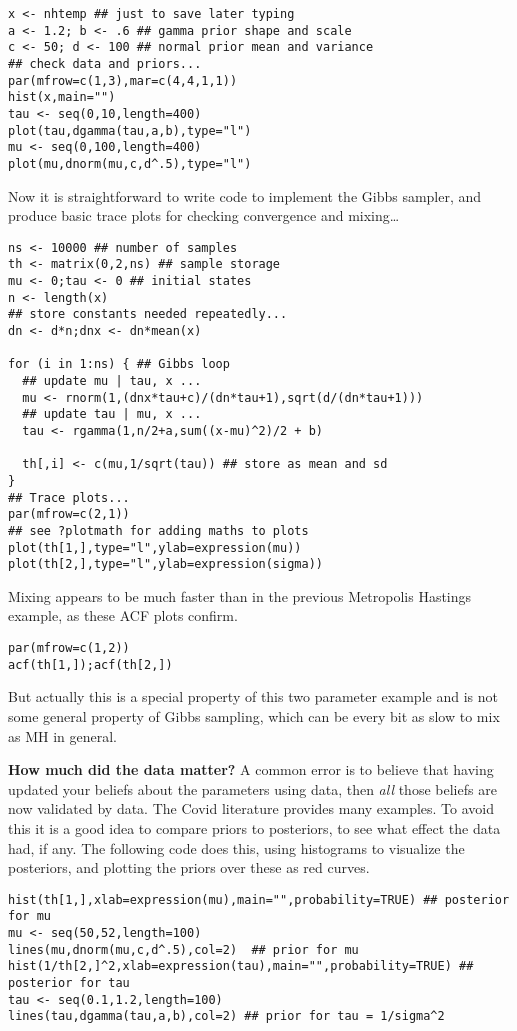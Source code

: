 \documentclass[10pt] {article}
\newcommand{\eps}[3]
{{\begin{center}
 \rotatebox{#1}{\scalebox{#2}{\texttt{[image: \#3]}}}
 \end{center}}
}
\theoremstyle{definition}
\begin{document}
\begin{lstlisting}
x <- nhtemp ## just to save later typing
a <- 1.2; b <- .6 ## gamma prior shape and scale
c <- 50; d <- 100 ## normal prior mean and variance
## check data and priors...
par(mfrow=c(1,3),mar=c(4,4,1,1))
hist(x,main="")
tau <- seq(0,10,length=400)
plot(tau,dgamma(tau,a,b),type="l")
mu <- seq(0,100,length=400)
plot(mu,dnorm(mu,c,d^.5),type="l")
\end{lstlisting}
\eps{-90}{.6}{check-prior.eps}
Now it is straightforward to write code to implement the Gibbs sampler, and produce basic trace plots for checking convergence and mixing\ldots 
\begin{lstlisting}
ns <- 10000 ## number of samples
th <- matrix(0,2,ns) ## sample storage
mu <- 0;tau <- 0 ## initial states
n <- length(x) 
## store constants needed repeatedly...
dn <- d*n;dnx <- dn*mean(x) 

for (i in 1:ns) { ## Gibbs loop
  ## update mu | tau, x ... 
  mu <- rnorm(1,(dnx*tau+c)/(dn*tau+1),sqrt(d/(dn*tau+1)))
  ## update tau | mu, x ... 
  tau <- rgamma(1,n/2+a,sum((x-mu)^2)/2 + b)
  
  th[,i] <- c(mu,1/sqrt(tau)) ## store as mean and sd
}
## Trace plots...
par(mfrow=c(2,1))
## see ?plotmath for adding maths to plots
plot(th[1,],type="l",ylab=expression(mu))
plot(th[2,],type="l",ylab=expression(sigma))
\end{lstlisting}
\eps{-90}{.5}{nh-trace.eps}
\noindent Mixing appears to be  much faster than in the previous Metropolis Hastings example, as these ACF plots confirm.
\begin{lstlisting}
par(mfrow=c(1,2))
acf(th[1,]);acf(th[2,])
\end{lstlisting}

\vspace*{-1cm}

\eps{-90}{.4}{nh-acf.eps}
\noindent But actually this is a special property of this two parameter example and is not some general property of Gibbs sampling, which can be every bit as slow to mix as MH in general. 

{\bf How much did the data matter?} A common error is to believe that having updated your beliefs about the parameters using data, then {\em all} those beliefs are now validated by data. The Covid literature provides many examples. To avoid this it is a good idea to compare priors to posteriors, to see what effect the data had, if any. The following code does this, using histograms to visualize the posteriors, and plotting the priors over these as red curves. 
\begin{lstlisting}
hist(th[1,],xlab=expression(mu),main="",probability=TRUE) ## posterior for mu
mu <- seq(50,52,length=100)
lines(mu,dnorm(mu,c,d^.5),col=2)  ## prior for mu
hist(1/th[2,]^2,xlab=expression(tau),main="",probability=TRUE) ## posterior for tau
tau <- seq(0.1,1.2,length=100) 
lines(tau,dgamma(tau,a,b),col=2) ## prior for tau = 1/sigma^2
\end{lstlisting}
\vspace*{-1cm}
\eps{-90}{.5}{nh-popr.eps}
\end{document}
